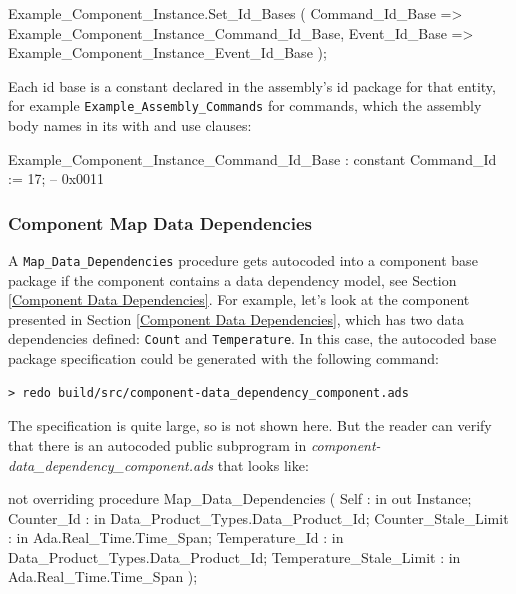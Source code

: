 \vspace{5mm} %
\begin{adacode}
  Example_Component_Instance.Set_Id_Bases (
    Command_Id_Base => Example_Component_Instance_Command_Id_Base,
    Event_Id_Base => Example_Component_Instance_Event_Id_Base
  );
\end{adacode}
\vspace{5mm} %

Each id base is a constant declared in the assembly's id package for that entity, for example \texttt{Example\_Assembly\_Commands} for commands, which the assembly body names in its with and use clauses:

\vspace{5mm} %
\begin{adacode}
  Example_Component_Instance_Command_Id_Base : constant Command_Id := 17; -- 0x0011
\end{adacode}
\vspace{5mm} %

\subsubsection{Component Map Data Dependencies} \label{Component Set Data Dependency IDs}

A \texttt{Map\_Data\_Dependencies} procedure gets autocoded into a component base package if the component contains a data dependency model, see Section \ref{Component Data Dependencies}. For example, let's look at the component presented in Section \ref{Component Data Dependencies}, which has two data dependencies defined: \texttt{Count} and \texttt{Temperature}. In this case, the autocoded base package specification could be generated with the following command:

\vspace{5mm} %
\begin{verbatim}
> redo build/src/component-data_dependency_component.ads
\end{verbatim}
\vspace{5mm} %

The specification is quite large, so is not shown here. But the reader can verify that there is an autocoded public subprogram in \textit{component-data\_dependency\_component.ads} that looks like:

\vspace{5mm} %
\begin{adacode}
not overriding procedure Map_Data_Dependencies (
  Self : in out Instance; 
  Counter_Id : in Data_Product_Types.Data_Product_Id;
  Counter_Stale_Limit : in Ada.Real_Time.Time_Span;
  Temperature_Id : in Data_Product_Types.Data_Product_Id; 
  Temperature_Stale_Limit : in Ada.Real_Time.Time_Span
);
\end{adacode}
\vspace{5mm} %

